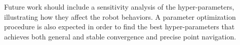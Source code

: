 \documentclass{article}
\begin{document}
Future work should include a sensitivity analysis of the hyper-parameters, illustrating how they affect the robot behaviors. A parameter optimization procedure is also expected in order to find the best hyper-parameters that achieves both general and stable convergence and precise point navigation.

\medskip


\end{document}
